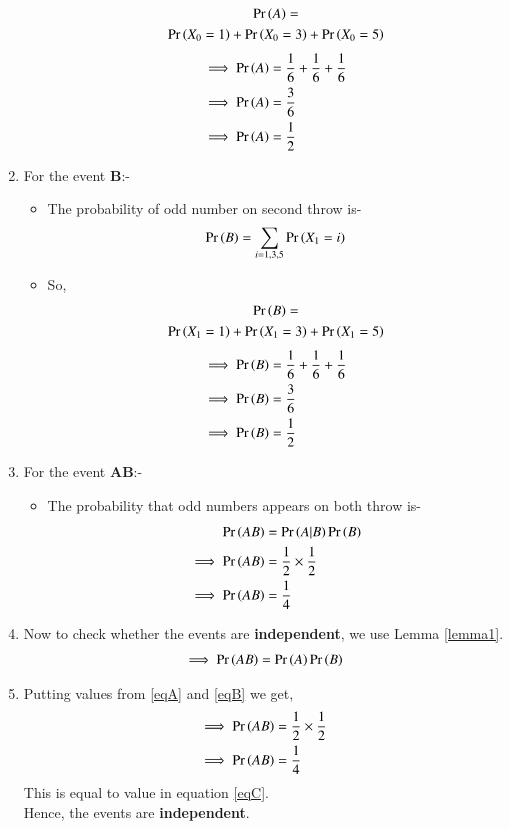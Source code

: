 \documentclass[journal,12pt,twocolumn]{IEEEtran}
\begin{document}
\begin{enumerate}
\begin{itemize}
\begin{multline}
    \Pr\left(A\right)=
    \\\Pr\left(X_0=1\right)+\Pr\left(X_0=3\right)+\Pr\left(X_0=5\right)
\end{multline}
\begin{align}
\implies\Pr\left(A\right)&=\frac{1}{6}+\frac{1}{6}+\frac{1}{6}
\\
\implies  \Pr\left(A\right) &= \frac{3}{6} 
\\
\implies \Pr\left(A\right)  &= \frac{1}{2} \label{eqA}
 \end{align}
 \end{itemize}
 \item For the event \textbf{B}:-
    \begin{itemize}
    \item The probability of odd number on second throw is-
    \begin{align}
        \Pr\left(B\right)=\sum_{i=1,3,5} \Pr\left(X_1=i\right)
    \end{align}
    \item So,
    \begin{multline}
    \Pr\left(B\right)=
    \\\Pr\left(X_1=1\right)+\Pr\left(X_1=3\right)+\Pr\left(X_1=5\right)
\end{multline}
\begin{align}
\implies \Pr\left(B\right)&=\frac{1}{6}+\frac{1}{6}+\frac{1}{6}
\\
\implies  \Pr\left(B\right) &= \frac{3}{6} 
\\
\implies  \Pr\left(B\right)&= \frac{1}{2} \label{eqB}
 \end{align}
 \end{itemize}
\item For the event \textbf{AB}:-
\begin{itemize}
    \item The probability that odd numbers appears on both throw is-
    \begin{align}
  \Pr\left(AB\right) &= \Pr\left(A|B\right)\Pr\left(B\right)\\
   \implies  \Pr\left(AB\right)  &= \frac{1}{2}\times\frac{1}{2}
   \\
   \implies  \Pr\left(AB\right) &=\frac{1}{4} \label{eqC}
 \end{align}
 \end{itemize}
\item Now to check whether the events are \textbf{independent}, we use Lemma \eqref{lemma1}.
\begin{align}
 \implies   \Pr\left(AB\right)= \Pr\left(A\right)\Pr\left(B\right)
    \end{align}
    \item Putting values from \eqref{eqA} and \eqref{eqB} we get,
    \begin{align}
  \implies  \Pr\left(AB\right) & = \frac{1}{2}\times\frac{1}{2}
    \\
\implies    \Pr\left(AB\right)&= \frac{1}{4}
\end{align}
This is equal to value in equation \eqref{eqC}.
\\
Hence, the events are \textbf{independent}.
\end{enumerate}
\end{document}
